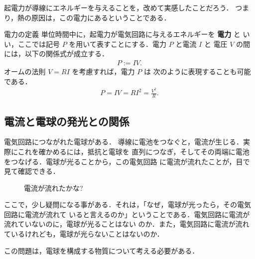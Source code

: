             起電力が導線にエネルギーを与えることを，改めて実感したことだろう．
            つまり，熱の原因は，この電力にあるということである．
                \begin{myshadebox}{電力の定義}
                    単位時間中に，起電力が電気回路に与えるエネルギーを \textbf{電力} と
                    いい，ここでは記号 $P$ を用いて表すことにする．電力 $P$ と電流 $I$ と
                    電圧 $V$ の間には，以下の関係式が成立する．
                        \begin{align}
                            P:= IV.
                        \end{align}
                    オームの法則 $V=RI$ を考慮すれば，電力 $P$ は
                    次のように表現することも可能である．
                        \begin{align}
                            P= IV = RI^{2} = \frac{V^{2}}{R}.
                        \end{align}
                \end{myshadebox}

        \subsection{電流と電球の発光との関係}
            電気回路につながれた電球がある．
            導線に電池をつなぐと，電流が生じる．実際にこれを確かめるには，抵抗と電球を
            直列につなぎ，そしてその両端に電池をつなげる．電球が光ることから，この電気回路
            に電流が流れたことが，目で見て確認できる．
               \begin{figure}[hbt]
                   \begin{center}
                       \label{fig:kidenryoku_to_denryu}
                       \caption{電流が流れたかな?}
                   \end{center}
               \end{figure}

            ここで，少し疑問になる事がある．それは，「なぜ，電球が光ったら，その電気回路に電流が流れて
            いると言えるのか」ということである．電気回路に電流が流れていないのに，電球が光ることはない
            のか．また，電気回路に電流が流れているけれども，電球が光らないことはないのか．

            この問題は，電球を構成する物質について考える必要がある．

